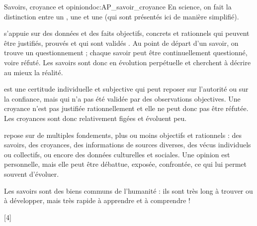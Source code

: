 \teteSndAP
{}


\begin{doc}{Savoirs, croyance et opinion}{doc:AP_savoir_croyance}
  En science, on fait la distinction entre un , une  et une  (qui sont présentés ici de manière simplifié).

  \begin{listePoints}
    \item
     s'appuie sur des données et des faits objectifs, concrets et rationnels qui peuvent être justifiés, prouvés et qui sont validés .
    Au point de départ d'un savoir, on trouve un questionnement ; chaque savoir peut être continuellement questionné, voire réfuté.
    Les savoirs sont donc en évolution perpétuelle et cherchent à décrire au mieux la réalité.
 
    \item 
     est une certitude individuelle et subjective qui peut reposer sur l'autorité ou sur la confiance, mais qui n'a pas été validée par des observations objectives.
    Une croyance n'est pas justifiée rationnellement et elle ne peut donc pas être réfutée.
    Les croyances sont donc relativement figées et évoluent peu.
  
    \item
     repose sur de multiples fondements, plus ou moins objectifs et rationnels : des savoirs, des croyances, des informations de sources diverses, des vécus individuels ou collectifs, ou encore des données culturelles et sociales.
    Une opinion est personnelle, mais elle peut être débattue, exposée, confrontée, ce qui lui permet souvent d'évoluer.
  \end{listePoints}

  Les savoirs sont des biens communs de l'humanité : ils sont très long à trouver ou à développer, mais très rapide à apprendre et à comprendre !
\end{doc}

[4]


